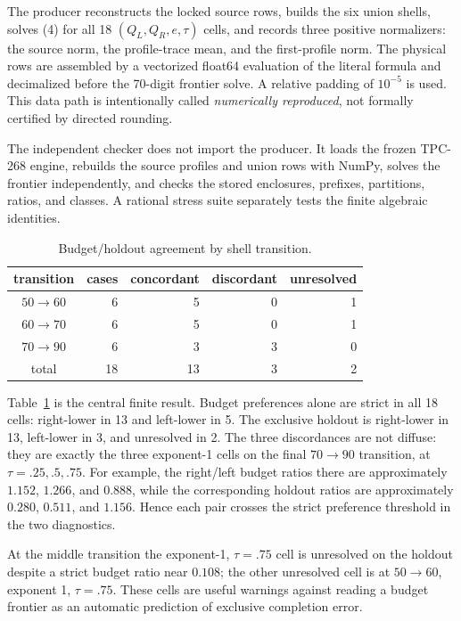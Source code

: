 \documentclass[11pt]{article}
\begin{document}
The producer reconstructs the locked source rows, builds the six union shells,
solves (4) for all 18 $(Q_L,Q_R,e,\tau)$ cells, and records three positive
normalizers: the source norm, the profile-trace mean, and the first-profile
norm.  The physical rows are assembled by a vectorized float64 evaluation of
the literal formula and decimalized before the 70-digit frontier solve.  A
relative padding of $10^{-5}$ is used.  This data path is intentionally called
\emph{numerically reproduced}, not formally certified by directed rounding.

The independent checker does not import the producer.  It loads the frozen
TPC-268 engine, rebuilds the source profiles and union rows with NumPy, solves
the frontier independently, and checks the stored enclosures, prefixes,
partitions, ratios, and classes.  A rational stress suite separately tests the
finite algebraic identities.

\begin{table}[t]
\centering\small
\caption{Budget/holdout agreement by shell transition.}
\label{tab:census}
\begin{tabular}{c r r r r}
\toprule
transition & cases & concordant & discordant & unresolved\\
\midrule
$50\to60$ & 6 & 5 & 0 & 1\\
$60\to70$ & 6 & 5 & 0 & 1\\
$70\to90$ & 6 & 3 & 3 & 0\\
\midrule
total & 18 & 13 & 3 & 2\\
\bottomrule
\end{tabular}
\end{table}

Table~\ref{tab:census} is the central finite result.  Budget preferences alone
are strict in all 18 cells: right-lower in 13 and left-lower in 5.  The
exclusive holdout is right-lower in 13, left-lower in 3, and unresolved in 2.
The three discordances are not diffuse: they are exactly the three exponent-1
cells on the final $70\to90$ transition, at $\tau=.25,.5,.75$.  For example,
the right/left budget ratios there are approximately $1.152$, $1.266$, and
$0.888$, while the corresponding holdout ratios are approximately $0.280$,
$0.511$, and $1.156$.  Hence each pair crosses the strict preference
threshold in the two diagnostics.

At the middle transition the exponent-1, $\tau=.75$ cell is unresolved on the
holdout despite a strict budget ratio near $0.108$; the other unresolved cell
is at $50\to60$, exponent 1, $\tau=.75$.  These cells are useful warnings
against reading a budget frontier as an automatic prediction of exclusive
completion error.
\end{document}
